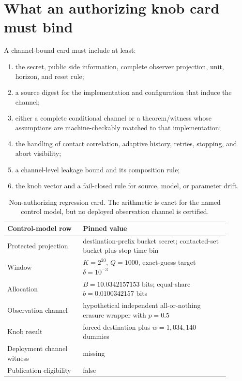 \documentclass[11pt]{article}
\begin{document}
\section{What an authorizing knob card must bind}\label{sec:card}
A channel-bound card must include at least:
\begin{enumerate}[leftmargin=*]
\item the secret, public side information, complete observer projection, unit, horizon, and reset rule;
\item a source digest for the implementation and configuration that induce the channel;
\item either a complete conditional channel or a theorem/witness whose assumptions are machine-checkably matched to that implementation;
\item the handling of contact correlation, adaptive history, retries, stopping, and abort visibility;
\item a channel-level leakage bound and its composition rule;
\item the knob vector and a fail-closed rule for source, model, or parameter drift.
\end{enumerate}

\begin{table}[t]
\centering
\small
\begin{tabular}{@{}p{0.31\linewidth}p{0.60\linewidth}@{}}
\toprule
\textbf{Control-model row} & \textbf{Pinned value}\\
\midrule
Protected projection & destination-prefix bucket secret; contacted-set bucket plus stop-time bin \\
Window & \(K=2^{20}\), \(Q=1000\), exact-guess target \(\delta=10^{-3}\) \\
Allocation & \(B=10.0342157153\) bits; equal-share \(b=0.0100342157\) bits \\
Observation channel & hypothetical independent all-or-nothing erasure wrapper with \(p=0.5\) \\
Knob result & forced destination plus \(w=1{,}034{,}140\) dummies \\
Deployment channel witness & missing \\
Publication eligibility & false \\
\bottomrule
\end{tabular}
\caption{Non-authorizing regression card. The arithmetic is exact for the named control model, but no deployed observation channel is certified.}
\label{tab:card}
\end{table}
\end{document}
